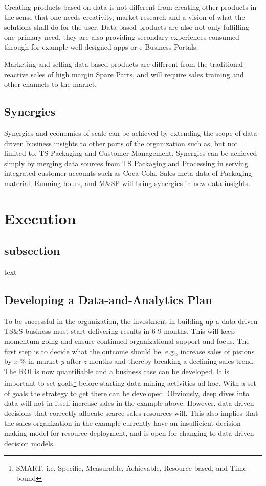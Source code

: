 \documentclass[10pt]{article} %
\begin{document}
Creating products based on data is not different from creating other products in the sense that one needs creativity, market research and a vision of what the solutions shall do for the user. Data based products are also not only fulfilling one primary need, they are also providing secondary experiences consumed through for example well designed apps or e-Business Portals.

Marketing and selling data based products are different from the traditional reactive sales of high margin Spare Parts, and will require sales training and other channels to the market.

\subsection{Synergies}

Synergies and economies of scale can be achieved by extending the scope of data-driven business insights to other parts of the organization such as, but not limited to, TS Packaging and Customer Management. Synergies can be achieved simply by merging data sources from TS Packaging and Processing in serving integrated customer accounts such as Coca-Cola. Sales meta data of Packaging material, Running hours, and M\&SP will bring synergies in new data insights.


\section{Execution}

\subsection{subsection}

text


\subsection{Developing a Data-and-Analytics Plan}

To be successful in the organization, the investment in building up a data driven TS\&S business must start delivering results in 6-9 months. This will keep momentum going and ensure continued organizational support and focus. The first step is to decide what the outcome should be, e.g., increase sales of pistons by \textit{x} \% in market \textit{y} after \textit{z} months and thereby breaking a declining sales trend. The ROI is now quantifiable and a business case can be developed. It is important to set goals\footnote{SMART, i.e, Specific, Measurable, Achievable, Resource based, and Time bound} before starting data mining activities ad hoc. With a set of goals the strategy to get there can be developed. Obviously, deep dives into data will not in itself increase sales in the example above. However, data driven decisions that correctly allocate scarce sales resources will. This also implies that the sales organization in the example currently have an insufficient decision making model for resource deployment, and is open for changing to data driven decision models.
\end{document}
